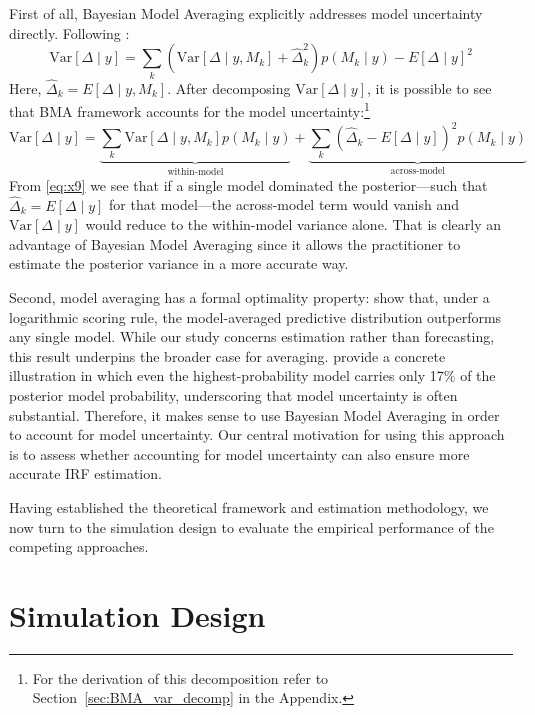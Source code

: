 \documentclass[12pt, a4paper]{article}
\begin{document}
First of all, Bayesian Model Averaging explicitly addresses model uncertainty directly. Following \citet{hoetingBayesianModelAveraging1999}:
\begin{equation} \label{eq:x8}
\mathrm{Var}[\Delta \mid y] = \sum_{k} \left( \mathrm{Var}[\Delta \mid y, M_k] + \hat{\Delta}_k^2 \right) p(M_k \mid y) - E[\Delta \mid y]^2
\end{equation}
Here, $\hat \Delta_k = E[\Delta\mid y, M_k]$. After decomposing $\mathrm{Var}[\Delta \mid y]$, it is possible to see that BMA framework accounts for the model uncertainty:\footnote{For the derivation of this decomposition refer to Section~\ref{sec:BMA_var_decomp} in the Appendix.}
\begin{equation} \label{eq:x9}
\mathrm{Var}[\Delta \mid y] = \underbrace{\sum_{k} \mathrm{Var}[\Delta \mid y, M_k] p(M_k \mid y)}_{\text{within-model}} + \underbrace{\sum_{k} \left( \hat{\Delta}_k - E[\Delta \mid y] \right)^2 p(M_k \mid y)}_{\text{across-model}}
\end{equation}
From \eqref{eq:x9} we see that if a single model dominated the posterior---such that $\hat \Delta_k = E[\Delta\mid y]$ for that model---the across-model term would vanish and $\mathrm{Var}[\Delta \mid y]$ would reduce to the within-model variance alone. That is clearly an advantage of Bayesian Model Averaging since it allows the practitioner to estimate the posterior variance in a more accurate way. 

Second, model averaging has a formal optimality property: \citet{madiganModelSelectionAccounting1994} show that, under a logarithmic scoring rule, the model-averaged predictive distribution outperforms any single model. While our study concerns estimation rather than forecasting, this result underpins the broader case for averaging. \citet{hoetingBayesianModelAveraging1999} provide a concrete illustration in which even the highest-probability model carries only 17\% of the posterior model probability, underscoring that model uncertainty is often substantial. Therefore, it makes sense to use Bayesian Model Averaging in order to account for model uncertainty. Our central motivation for using this approach is to assess whether accounting for model uncertainty can also ensure more accurate IRF estimation. 

Having established the theoretical framework and estimation methodology, we now turn to the simulation design to evaluate the empirical performance of the competing approaches.

\section{Simulation Design}
\label{sec:simulation}
\end{document}
